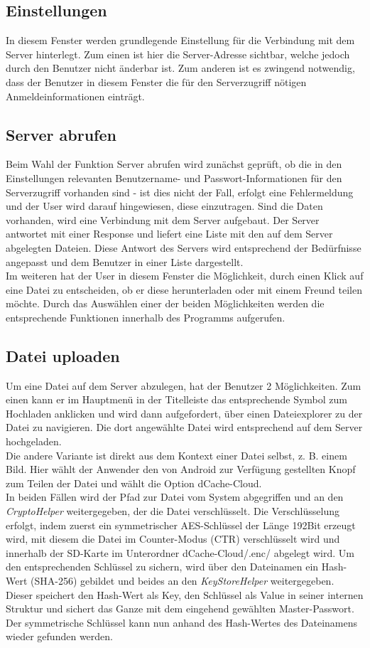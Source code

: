 \documentclass[10pt, a4paper,headsepline,pointednumbers]{scrreprt}
\begin{document}
\subsection{Einstellungen}
In diesem Fenster werden grundlegende Einstellung für die Verbindung mit dem Server hinterlegt. Zum einen ist hier die Server-Adresse sichtbar, welche jedoch durch den Benutzer nicht änderbar ist. Zum anderen ist es zwingend notwendig, dass der Benutzer in diesem Fenster die für den Serverzugriff nötigen Anmeldeinformationen einträgt.


\subsection{Server abrufen}
Beim Wahl der Funktion Server abrufen wird zunächst geprüft, ob die in den Einstellungen relevanten Benutzername- und Passwort-Informationen für den Serverzugriff vorhanden sind - ist dies nicht der Fall, erfolgt eine Fehlermeldung und der User wird darauf hingewiesen, diese einzutragen. Sind die Daten vorhanden, wird eine Verbindung mit dem Server aufgebaut. Der Server antwortet mit einer Response und liefert eine Liste mit den auf dem Server abgelegten Dateien. Diese Antwort des Servers wird entsprechend der Bedürfnisse angepasst und dem Benutzer in einer Liste dargestellt. \\
Im weiteren hat der User in diesem Fenster die Möglichkeit, durch einen Klick auf eine Datei zu entscheiden, ob er diese herunterladen oder mit einem Freund teilen möchte. Durch das Auswählen einer der beiden Möglichkeiten werden die entsprechende Funktionen innerhalb des Programms aufgerufen.


\subsection{Datei uploaden}
Um eine Datei auf dem Server abzulegen, hat der Benutzer 2 Möglichkeiten. Zum einen kann er im Hauptmenü in der Titelleiste das entsprechende Symbol zum Hochladen anklicken und wird dann aufgefordert, über einen Dateiexplorer zu der Datei zu navigieren. Die dort angewählte Datei wird entsprechend auf dem Server hochgeladen. \\
Die andere Variante ist direkt aus dem Kontext einer Datei selbst, z. B. einem Bild. Hier wählt der Anwender den von Android zur Verfügung gestellten Knopf zum Teilen der Datei und wählt die Option dCache-Cloud. \\
In beiden Fällen wird der Pfad zur Datei vom System abgegriffen und an den \textit{CryptoHelper} weitergegeben, der die Datei  verschlüsselt. Die Verschlüsselung erfolgt, indem zuerst ein symmetrischer AES-Schlüssel der Länge 192Bit erzeugt wird, mit diesem die Datei im Counter-Modus (CTR) verschlüsselt wird und innerhalb der SD-Karte im Unterordner dCache-Cloud/.enc/ abgelegt wird. Um den entsprechenden Schlüssel zu sichern, wird über den Dateinamen ein Hash-Wert (SHA-256) gebildet und beides an den \textit{KeyStoreHelper} weitergegeben. Dieser speichert den  Hash-Wert als Key, den Schlüssel als Value in seiner internen Struktur und sichert das Ganze mit dem eingehend gewählten Master-Passwort. Der symmetrische Schlüssel kann nun anhand des Hash-Wertes des Dateinamens wieder gefunden werden.
\end{document}

